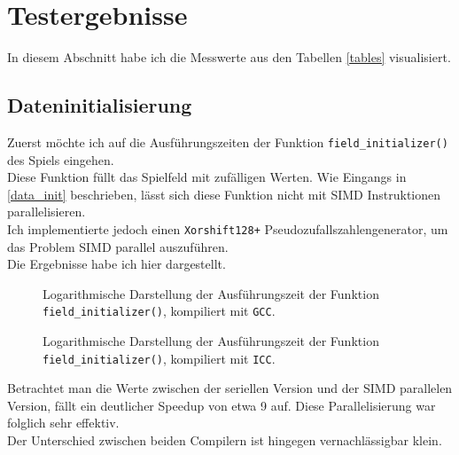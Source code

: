 \documentclass[german,plainarticle,hyperref,utf8]{zihpub}
\begin{document}
	\newpage
	\section{Testergebnisse} \label{erg}
	In diesem Abschnitt habe ich die Messwerte aus den Tabellen \ref{tables} visualisiert.
	\subsection{Dateninitialisierung}
	Zuerst möchte ich auf die Ausführungszeiten der Funktion \texttt{field\_initializer()} des Spiels eingehen.\\
	Diese Funktion füllt das Spielfeld mit zufälligen Werten. Wie Eingangs in \ref{data_init} beschrieben, lässt sich diese Funktion nicht mit SIMD Instruktionen parallelisieren.\\
	Ich implementierte jedoch einen \texttt{Xorshift128+} Pseudozufallszahlengenerator, um das Problem SIMD parallel auszuführen.\\
	Die Ergebnisse habe ich hier dargestellt.
	
	\begin{figure}[h]
		\centering
		
		\caption{Logarithmische Darstellung der Ausführungszeit der Funktion \texttt{field\_initializer()}, kompiliert mit \texttt{GCC}.}
	\end{figure}
	\begin{figure}[h]
		\centering
		
		\caption{Logarithmische Darstellung der Ausführungszeit der Funktion \texttt{field\_initializer()}, kompiliert mit \texttt{ICC}.}
	\end{figure}
	\newpage
	Betrachtet man die Werte zwischen der seriellen Version und der SIMD parallelen Version, fällt ein deutlicher Speedup von etwa 9 auf. Diese Parallelisierung war folglich sehr effektiv.\\
	Der Unterschied zwischen beiden Compilern ist hingegen vernachlässigbar klein.
	\clearpage
\end{document}
